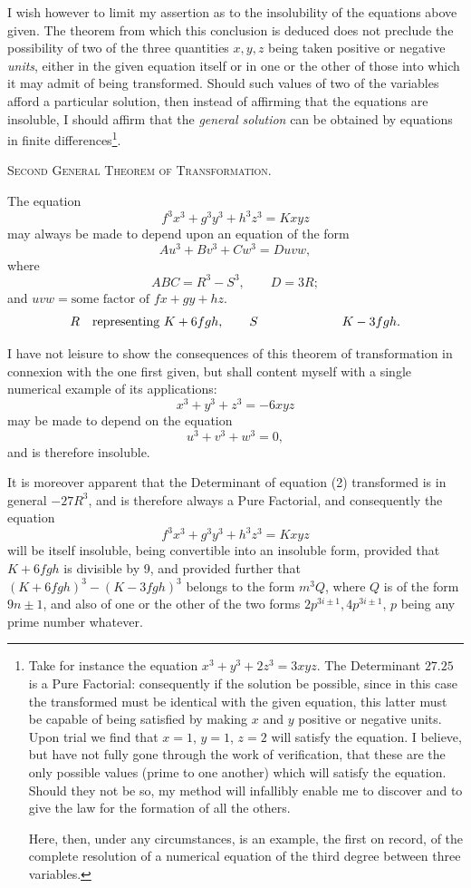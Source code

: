 \documentclass[11pt]{article}
\newcommand{\sourcepage}[1]{\marginpar{\scriptsize p.~#1}}
\begin{document}
{{I wish however to limit my assertion as to the insolubility of the equations above given. The theorem from which this conclusion is deduced does not preclude the possibility of two of the three quantities $x,y,z$ being taken positive or negative \emph{units}, either in the given equation itself or in one or the other of those into which it may admit of being transformed. Should such values of two of the variables afford a particular solution, then instead of affirming that the equations are insoluble, I should affirm that the \emph{general solution} can be obtained by equations in finite differences\footnote{Take for instance the equation $x^3+y^3+2z^3=3xyz$. The Determinant $27.25$ is a Pure Factorial: consequently if the solution be possible, since in this case the transformed must be identical with the given equation, this latter must be capable of being satisfied by making $x$ and $y$ positive or negative units. Upon trial we find that $x=1$, $y=1$, $z=2$ will satisfy the equation. I believe, but have not fully gone through the work of verification, that these are the only possible values (prime to one another) which will satisfy the equation. Should they not be so, my method will infallibly enable me to discover and to give the law for the formation of all the others.

Here, then, under any circumstances, is an example, the first on record, of the complete resolution of a numerical equation of the third degree between three variables.}.

\begin{center}
{\scshape Second General Theorem of Transformation.}
\end{center}

The equation
\[
f^3x^3+g^3y^3+h^3z^3=Kxyz \tag{2}
\]
may always be made to depend upon an equation of the form
\[
Au^3+Bv^3+Cw^3=Duvw,
\]
where
\[
ABC=R^3-S^3,
\qquad
D=3R;
\]
and $uvw=\text{some factor of }fx+gy+hz$.
\[
R\quad\text{representing }K+6fgh,
\qquad
S\quad\text{\phantom{representing }}K-3fgh.
\]

\sourcepage{109}
I have not leisure to show the consequences of this theorem of transformation in connexion with the one first given, but shall content myself with a single numerical example of its applications:
\[
x^3+y^3+z^3=-6xyz
\]
may be made to depend on the equation
\[
u^3+v^3+w^3=0,
\]
and is therefore insoluble.

It is moreover apparent that the Determinant of equation (2) transformed is in general $-27R^3$, and is therefore always a Pure Factorial, and consequently the equation
\[
f^3x^3+g^3y^3+h^3z^3=Kxyz
\]
will be itself insoluble, being convertible into an insoluble form, provided that $K+6fgh$ is divisible by 9, and provided further that $(K+6fgh)^3-(K-3fgh)^3$ belongs to the form $m^3Q$, where $Q$ is of the form $9n\pm1$, and also of one or the other of the two forms $2p^{3i\pm1},4p^{3i\pm1}$, $p$ being any prime number whatever.

}}
\end{document}
